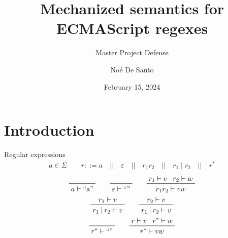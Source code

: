 \documentclass[aspectratio=169]{beamer}
\title{Mechanized semantics for ECMAScript regexes}
\subtitle{Master Project Defense}
\author{No\'{e} De Santo}
\institute{EPFL}
\date{February 15, 2024}
\newcommand{\eps}[0]{\varepsilon}
\newcommand{\disj}[0]{\mathbin{|}}
\renewcommand{\star}[0]{^{*}}
\newcommand{\rulesep}[0]{\quad{}||\quad{}}
\begin{document}
    \maketitle

    \section{Introduction}

    \begin{frame}{Regular expressions}
        \pause{}%
        \begin{align*}
            a \in  \Sigma \qquad{} r \mathrel{::=}  a \rulesep{} \eps{} \rulesep{} r_1 r_2 \rulesep{} r_1 \disj{} r_2 \rulesep{} r\star{}
        \end{align*}
        \pause{}%
        \begin{gather*}
            \prfaxiom{a \vdash{} \text{``a''}} \qquad{}
            \prfaxiom{\eps{} \vdash{} \text{``''}} \qquad{}
            \prftree{\prfassumption{r_1 \vdash{} v}}{\prfassumption{r_2 \vdash{} w}}{r_1r_2 \vdash{} vw} \\
            \prftree{\prfassumption{r_1 \vdash{} v}}{r_1 \disj{} r_2 \vdash{} v} \qquad{}
            \prftree{\prfassumption{r_2 \vdash{} v}}{r_1 \disj{} r_2 \vdash{} v} \\
            \prfaxiom{r\star{} \vdash{} \text{``''}} \qquad{}
            \prftree{\prfassumption{r \vdash{} v}}{\prfassumption{r\star{} \vdash{} w}}{r\star{} \vdash{} vw}
        \end{gather*}
    \end{frame}
\end{document}
